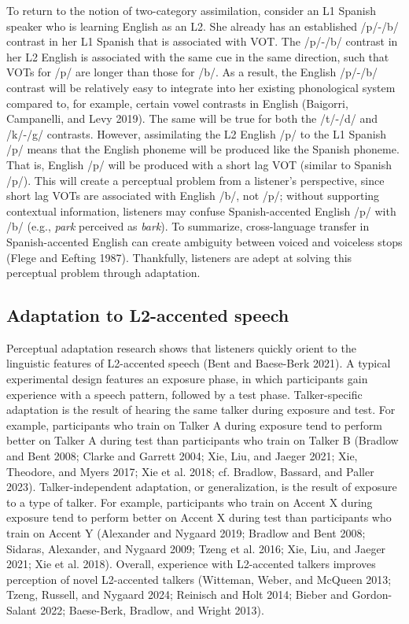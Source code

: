 \documentclass[
  preprint]{elsarticle}
\begin{document}
To return to the notion of two-category assimilation, consider an L1 Spanish speaker who is learning English as an L2.
She already has an established /p/-/b/ contrast in her L1 Spanish that is associated with VOT.
The /p/-/b/ contrast in her L2 English is associated with the same cue in the same direction, such that VOTs for /p/ are longer than those for /b/.
As a result, the English /p/-/b/ contrast will be relatively easy to integrate into her existing phonological system compared to, for example, certain vowel contrasts in English (Baigorri, Campanelli, and Levy 2019).
The same will be true for both the /t/-/d/ and /k/-/g/ contrasts.
However, assimilating the L2 English /p/ to the L1 Spanish /p/ means that the English phoneme will be produced like the Spanish phoneme.
That is, English /p/ will be produced with a short lag VOT (similar to Spanish /p/).
This will create a perceptual problem from a listener's perspective, since short lag VOTs are associated with English /b/, not /p/; without supporting contextual information, listeners may confuse Spanish-accented English /p/ with /b/ (e.g., \emph{park} perceived as \emph{bark}).
To summarize, cross-language transfer in Spanish-accented English can create ambiguity between voiced and voiceless stops (Flege and Eefting 1987).
Thankfully, listeners are adept at solving this perceptual problem through adaptation.

\hypertarget{adaptation-to-l2-accented-speech}{%
\subsection{Adaptation to L2-accented speech}\label{adaptation-to-l2-accented-speech}}

Perceptual adaptation research shows that listeners quickly orient to the linguistic features of L2-accented speech (Bent and Baese-Berk 2021).
A typical experimental design features an exposure phase, in which participants gain experience with a speech pattern, followed by a test phase.
Talker-specific adaptation is the result of hearing the same talker during exposure and test.
For example, participants who train on Talker A during exposure tend to perform better on Talker A during test than participants who train on Talker B (Bradlow and Bent 2008; Clarke and Garrett 2004; Xie, Liu, and Jaeger 2021; Xie, Theodore, and Myers 2017; Xie et al. 2018; cf. Bradlow, Bassard, and Paller 2023).
Talker-independent adaptation, or generalization, is the result of exposure to a type of talker.
For example, participants who train on Accent X during exposure tend to perform better on Accent X during test than participants who train on Accent Y (Alexander and Nygaard 2019; Bradlow and Bent 2008; Sidaras, Alexander, and Nygaard 2009; Tzeng et al. 2016; Xie, Liu, and Jaeger 2021; Xie et al. 2018).
Overall, experience with L2-accented talkers improves perception of novel L2-accented talkers (Witteman, Weber, and McQueen 2013; Tzeng, Russell, and Nygaard 2024; Reinisch and Holt 2014; Bieber and Gordon-Salant 2022; Baese-Berk, Bradlow, and Wright 2013).
\end{document}

